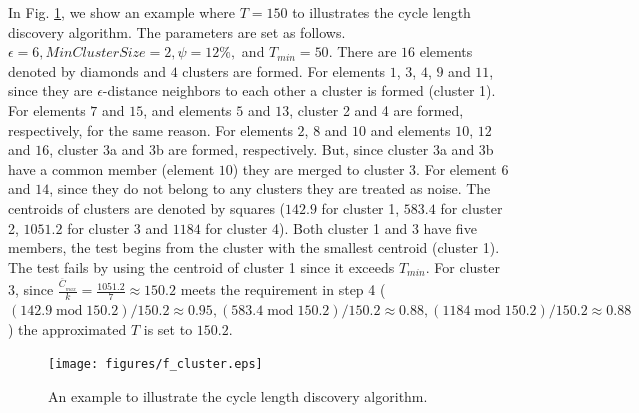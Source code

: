 \documentclass[final,oneside,onecolumn,12pt,a4paper]{book}%
\begin{document}
In Fig. \ref{fig:f_cluster}, we show an example where $T=150$ to illustrates
the cycle length discovery algorithm. The parameters are set as follows.
$\epsilon=6,MinClusterSize=2,\psi=12\%,$ and $T_{min}=50.$ There are $16$
elements denoted by diamonds and $4$ clusters are formed. For elements $1$,
$3$, $4$, $9$ and $11$, since they are $\epsilon$-distance neighbors to each
other a cluster is formed (cluster 1). For elements $7$ and $15$, and elements
$5$ and $13$, cluster 2 and 4 are formed, respectively, for the same reason.
For elements $2$, $8$ and $10$ and elements $10$, $12$ and $16$, cluster 3a
and 3b are formed, respectively. But, since cluster 3a and 3b have a common
member (element $10$) they are merged to cluster 3. For element $6$ and $14$,
since they do not belong to any clusters they are treated as noise. The
centroids of clusters are denoted by squares ($142.9$ for cluster 1, $583.4$
for cluster 2, $1051.2$ for cluster 3 and $1184$ for cluster 4). Both cluster
1 and 3 have five members, the test begins from the cluster with the smallest
centroid (cluster 1). The test fails by using the centroid of cluster 1 since
it exceeds $T_{min}$. For cluster 3, since $\frac{\overline{C}_{_{max}}}%
{k}=\frac{1051.2}{7}\approx150.2$ meets the requirement in step 4 ($\left(
142.9\operatorname{mod}150.2\right)  /150.2\approx0.95,\left(
583.4\operatorname{mod}150.2\right)  /150.2\approx0.88,\left(
1184\operatorname{mod}150.2\right)  /150.2\approx0.88$) the approximated $T$
is set to $150.2$.\begin{figure}[pth]
\centerline{\texttt{[image: figures/f\_cluster.eps]}} \hfill\caption{An example to illustrate the cycle
length discovery algorithm.}%
\label{fig:f_cluster}%
\end{figure}
\end{document}
